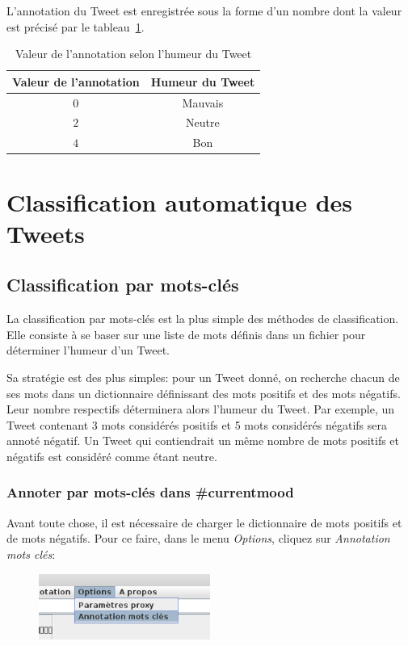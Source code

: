 \documentclass[12pt,a4paper]{report}
\newcommand{\CMName}{\#currentmood}
\begin{document}
L'annotation du Tweet est enregistrée sous la forme d'un nombre dont la valeur
est précisé par le tableau~\ref{tableau-valeurs-annotation}.

\begin{table}[h]
	\centering
	\begin{tabular}{c c}
		\textbf{Valeur de l'annotation}	& \textbf{Humeur du Tweet}\\
		\midrule
		$0$				& Mauvais\\
		\midrule
		$2$				& Neutre\\
		\midrule
		$4$				& Bon
	\end{tabular}
	\caption{Valeur de l'annotation selon l'humeur du Tweet}
\label{tableau-valeurs-annotation}
\end{table}

\chapter{Classification automatique des Tweets}
\label{chapter-classifications}

\section{Classification par mots-clés}
La classification par mots-clés est la plus simple des méthodes de
classification. Elle consiste à se baser sur une liste de mots définis dans un
fichier pour déterminer l'humeur d'un Tweet.

Sa stratégie est des plus simples: pour un Tweet donné, on recherche
chacun de ses mots dans un dictionnaire définissant des mots positifs et des
mots négatifs. Leur nombre respectifs déterminera alors l'humeur du Tweet. Par
exemple, un Tweet contenant 3 mots considérés positifs et 5 mots considérés
négatifs sera annoté négatif. Un Tweet qui contiendrait un même nombre de mots
positifs et négatifs est considéré comme étant neutre.

\subsection{Annoter par mots-clés dans \CMName}
Avant toute chose, il est nécessaire de charger le dictionnaire de mots positifs
et de mots négatifs. Pour ce faire, dans le menu \textit{Options}, cliquez sur
\textit{Annotation mots clés}:

\begin{figure}[h]
	\centering
	\includegraphics[width=0.5\textwidth]{img/capture_menumotcle.png}
\end{figure}
\end{document}
